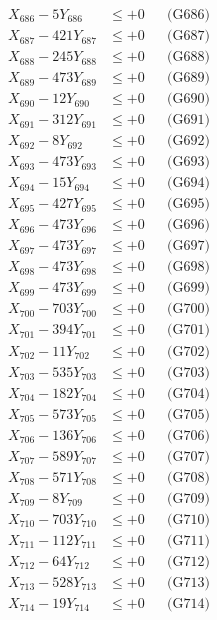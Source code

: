 \documentclass[a4paper,10pt]{article}
\begin{document}
{\begin{align}
X_{686} - 5Y_{686} &\leq +0 && \text{(G686)} \\
X_{687} - 421Y_{687} &\leq +0 && \text{(G687)} \\
X_{688} - 245Y_{688} &\leq +0 && \text{(G688)} \\
X_{689} - 473Y_{689} &\leq +0 && \text{(G689)} \\
X_{690} - 12Y_{690} &\leq +0 && \text{(G690)} \\
\allowbreak
X_{691} - 312Y_{691} &\leq +0 && \text{(G691)} \\
X_{692} - 8Y_{692} &\leq +0 && \text{(G692)} \\
X_{693} - 473Y_{693} &\leq +0 && \text{(G693)} \\
X_{694} - 15Y_{694} &\leq +0 && \text{(G694)} \\
X_{695} - 427Y_{695} &\leq +0 && \text{(G695)} \\
X_{696} - 473Y_{696} &\leq +0 && \text{(G696)} \\
X_{697} - 473Y_{697} &\leq +0 && \text{(G697)} \\
X_{698} - 473Y_{698} &\leq +0 && \text{(G698)} \\
X_{699} - 473Y_{699} &\leq +0 && \text{(G699)} \\
X_{700} - 703Y_{700} &\leq +0 && \text{(G700)} \\
\allowbreak
X_{701} - 394Y_{701} &\leq +0 && \text{(G701)} \\
X_{702} - 11Y_{702} &\leq +0 && \text{(G702)} \\
X_{703} - 535Y_{703} &\leq +0 && \text{(G703)} \\
X_{704} - 182Y_{704} &\leq +0 && \text{(G704)} \\
X_{705} - 573Y_{705} &\leq +0 && \text{(G705)} \\
X_{706} - 136Y_{706} &\leq +0 && \text{(G706)} \\
X_{707} - 589Y_{707} &\leq +0 && \text{(G707)} \\
X_{708} - 571Y_{708} &\leq +0 && \text{(G708)} \\
X_{709} - 8Y_{709} &\leq +0 && \text{(G709)} \\
X_{710} - 703Y_{710} &\leq +0 && \text{(G710)} \\
\allowbreak
X_{711} - 112Y_{711} &\leq +0 && \text{(G711)} \\
X_{712} - 64Y_{712} &\leq +0 && \text{(G712)} \\
X_{713} - 528Y_{713} &\leq +0 && \text{(G713)} \\
X_{714} - 19Y_{714} &\leq +0 && \text{(G714)} \\

\end{align}}
\end{document}
